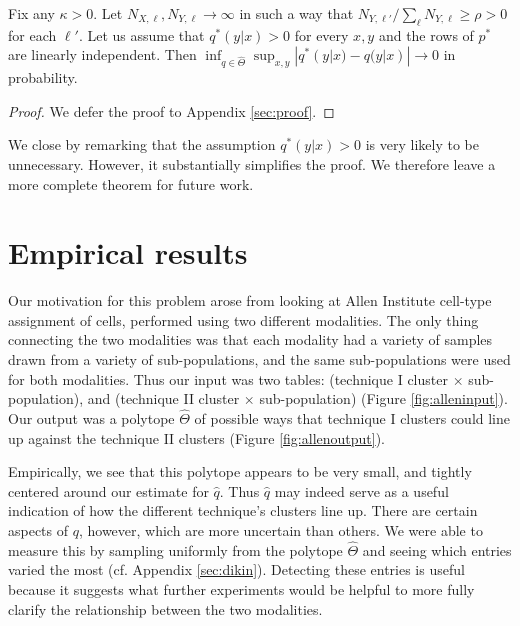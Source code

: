 \vspace{.1in}
\begin{thm}
Fix any $\kappa>0$.  Let $N_{X,\ell},N_{Y,\ell}\rightarrow\infty$ in such a way that $N_{Y,\ell'}/\sum_{\ell}N_{Y,\ell} \geq \rho>0$ for each $\ell'$.  Let us assume that $q^*(y|x)>0$ for every $x,y$ and the rows of $p^*$ are linearly independent.  Then $\inf_{q\in \hat\Theta} \sup_{x,y}|q^*(y|x)-q(y|x)|\rightarrow 0$ in probability.
\end{thm}

\begin{proof}
We defer the proof to Appendix \ref{sec:proof}.
\end{proof}

We close by remarking that the assumption $q^*(y|x)>0$ is very likely to be unnecessary.  However, it substantially simplifies the proof.  We therefore leave a more complete theorem for future work.  

\section{Empirical results}

Our motivation for this problem arose from looking at Allen Institute cell-type assignment of cells, performed using two different modalities.  The only thing connecting the two modalities was that each modality had a variety of samples drawn from a variety of sub-populations, and the same sub-populations were used for both modalities.  Thus our input was two tables: (technique I cluster $\times$ sub-population), and (technique II cluster $\times$ sub-population) (Figure \ref{fig:alleninput}).  Our output was a polytope $\hat \Theta$ of possible ways that technique I clusters could line up against the technique II clusters (Figure \ref{fig:allenoutput}).  

Empirically, we see that this polytope appears to be very small, and tightly centered around our estimate for $\hat q$.  Thus $\hat q$ may indeed serve as a useful indication of how the different technique's clusters line up.  There are certain aspects of $q$, however, which are more uncertain than others.  We were able to measure this by sampling uniformly from the polytope $\hat \Theta$ and seeing which entries varied the most (cf. Appendix \ref{sec:dikin}).  Detecting these entries is useful because it suggests what further experiments would be helpful to more fully clarify the relationship between the two modalities.  

